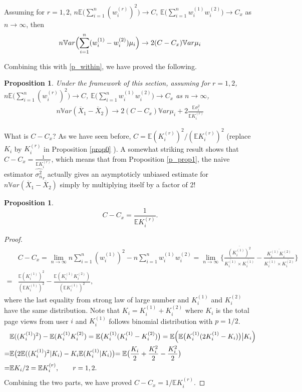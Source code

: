 \documentclass[10pt]{article}
\newcommand{\wht}{\widehat}
\newcommand{\var}{\ensuremath{\mathbb Var}}
\newcommand{\bbe}{\mathbb{E}}
\newcommand{\xbar}{\overline{X}}
\newcommand{\naiveest}{\wht{\sigma^2_n}}
\newtheorem{prop}[thm]{Proposition}
\begin{document}
Assuming for $r=1,2$, $n\bbe \bigl (\sum_{i=1}^n (w_i^{(r)})^2\bigr)\to C$,  $\bbe\bigl( \sum_{i=1}^n w_i^{(1)}w_i^{(2)}\bigr) \to C_{x}$ as $n\to \infty$, then 
\begin{align}\label{p_between}
n\var\Bigl( \sum_{i=1}^n (w_i^{(1)}-w_i^{(2)})\mu_i\Bigr) \to 2(C-C_x) \var \mu_i
\end{align}

Combining this with \eqref{p_within}, we have proved the following.
\begin{prop}\label{p_prop2}
Under the framework of this section, assuming for $r=1,2$, $n\bbe \bigl (\sum_{i=1}^n (w_i^{(r)})^2\bigr)\to C$,  $\bbe\bigl( \sum_{i=1}^n w_i^{(1)}w_i^{(2)}\bigr) \to C_{x}$ as $n\to \infty$, 
\begin{align}\label{p_truevar}
n\var(\xbar_1-\xbar_2) \to 2(C-C_x) \var \mu_i + 2\frac{\bbe \sigma_i^2}{\bbe K_i^{(r)}}
\end{align}
\end{prop}

What is $C-C_x$? As we have seen before, $C = \bbe (K_i^{(r)})^2 / (\bbe K_i^{(r)})^2$ (replace $K_i$ by $K_i^{(r)}$ in Proposition \ref{prop0} ). A somewhat striking result shows that $C- C_x = \frac{1}{\bbe K_i^{(r)}}$, which means that from Proposition \ref{p_prop1}, the naive estimator $\naiveest_r$ actually gives an asymptoticly unbiased estimate for $n\var (\xbar_1-\xbar_2)$ simply by multiplying itself by a factor of 2!

\begin{prop}\label{p_prop0}
\[C - C_x = \frac{1}{\bbe K_i^{(r)}}.\]
\end{prop}

\begin{proof}
\begin{align*}
&C - C_x = \lim_{n\to\infty} n\sum_{i=1}^n (w_i^{(1)})^2 - n\sum_{i=1}^n w_i^{(1)}w_i^{(2)} = \lim_{n\to\infty}\Biggl\{ \frac{\overline{(K_i^{(1)})^2}}{\overline{K_i^{(1)}}\times \overline{K_i^{(1)}}} - \frac{\overline{K_i^{(1)}K_i^{(2)}}}{\overline{K_i^{(1)}}\times \overline{K_i^{(2)}}} \Biggr \}\\
=& \frac{\bbe (K_i^{(1)})^2}{(\bbe K_i^{(1)})^2} - \frac{\bbe (K_i^{(1)}K_i^{(2)})}{(\bbe K_i^{(1)})^2},
\end{align*}
where the last equality from strong law of large number and $K_i^{(1)}$ and $K_i^{(2)}$ have the same distribution. Note that $K_i = K_i^{(1)}+K_i^{(2)}$ where $K_i$ is the total page views from user $i$ and $K_i^{(1)}$ follows binomial distribution with $p=1/2$.
\begin{align*}
&\bbe((K_i^{(1)})^2) - \bbe (K_i^{(1)}K_i^{(2)}) = \bbe\bigl( K_i^{(1)}(K_i^{(1)}-K_i^{(2)})\bigr) = \bbe \Bigl(\bbe\bigl( K_i^{(1)}(2K_i^{(1)}-K_i)\bigr)\big| K_i \Bigr) \\
=& \bbe \bigl( 2\bbe((K_i^{(1)})^2|K_i) - K_i \bbe(K_i^{(1)}|K_i)  \bigl) = \bbe \bigl( \frac{K_i}{2}+\frac{K_i^2}{2} - \frac{K_i^2}{2} \bigr) \\
=&  \bbe{K_i}/2 = \bbe K_i^{(r)},  \qquad r=1,2.
\end{align*}
Combining the two parts, we have proved $C - C_x = 1/ \bbe K_i^{(r)}$.
\end{proof}
\end{document}
